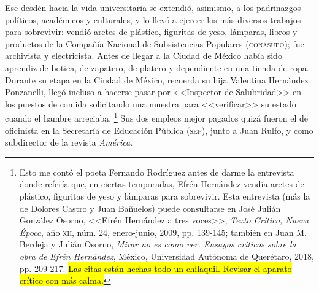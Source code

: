 \documentclass[14pt,twoside,final]{extbook} %
\let\oldfootnote\footnote
\renewcommand\footnote[1]{%
\oldfootnote{\hspace{1mm}#1}}
\begin{document}
Ese desdén hacia la vida universitaria se extendió, asimismo, a los padrinazgos políticos, académicos y culturales, y lo llevó a ejercer los más diversos trabajos para sobrevivir: vendió aretes de plástico, figuritas de yeso, lámparas, libros
y productos de la Compañía Nacional de Subsistencias Populares (\textsc{conasupo}); fue archivista y electricista. Antes de llegar a la Ciudad de México había sido aprendiz de botica, de zapatero, de platero y dependiente en una tienda de ropa. Durante su etapa en la Ciudad de México, recuerda su hija Valentina Hernández Ponzanelli, llegó incluso a hacerse pasar por <<Inspector de Salubridad>> en los puestos de comida solicitando una muestra para <<verificar>> su estado cuando el hambre arreciaba.\footnote{Esto me contó el poeta Fernando Rodríguez antes de darme la entrevista donde refería que, en ciertas temporadas, Efrén Hernández vendía aretes de plástico, figuritas de yeso y lámparas para sobrevivir. Esta entrevista (más la de Dolores Castro y Juan Bañuelos) puede consultarse en José Julián González Osorno, <<Efrén Hernández a tres voces>>, \emph{Texto Crítico, Nueva Época}, año \textsc{xii}, núm. 24, enero-junio, 2009, pp. \mbox{139-145}; también en Juan M. Berdeja y Julián Osorno, \emph{Mirar no es como ver. Ensayos críticos sobre la obra de Efrén Hernández}, México, Universidad Autónoma de Querétaro, 2018, pp. 209-217. \hl{Las citas están hechas todo un chilaquil. Revisar el aparato crítico con más calma.}} Sus dos empleos mejor pagados quizá fueron el de oficinista en la Secretaría de Educación Pública (\textsc{sep}), junto a Juan Rulfo, y como subdirector de la revista \emph{América}.
\end{document}
